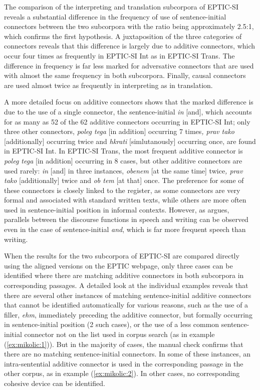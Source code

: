 \documentclass[output=paper]{langscibook}
\begin{document}
\newpage
The comparison of the interpreting and translation subcorpora of EPTIC-SI reveals a substantial difference in the frequency of use of sentence-initial connectors between the two subcorpora with the ratio being approximately 2.5:1, which confirms the first hypothesis. A juxtaposition of the three categories of connectors reveals that this difference is largely due to additive connectors, which occur four times as frequently in EPTIC-SI Int as in EPTIC-SI Trans. The difference in frequency is far less marked for adversative connectors that are used with almost the same frequency in both subcorpora. Finally, causal connectors are used almost twice as frequently in interpreting as in translation. 

A more detailed focus on additive connectors shows that the marked difference is due to the use of a single connector, the sentence-initial \textit{in} [and], which accounts for as many as 52 of the 62 additive connectors occurring in EPTIC-SI Int; only three other connectors, \textit{poleg tega} [in addition] occurring 7 times\textit{, prav tako} [additionally] occurring twice and \textit{hkrati} [simlutanously] occurring once, are found in EPTIC-SI Int. In EPTIC-SI Trans, the most frequent additive connector is \textit{poleg tega} [in addition] occurring in 8 cases, but other additive connectors are used rarely: \textit{in} [and] in three instances, \textit{obenem} [at the same time] twice\textit{, prav tako} [additionally] twice and \textit{ob tem} [at that] once. The preference for some of these connectors is closely linked to the register, as some connectors are very formal and associated with standard written texts, while others are more often used in sentence-initial position in informal contexts. However, as \citet{Dorgeloh2004} argues, parallels between the discourse functions in speech and writing can be observed even in the case of sentence-initial \textit{and}, which is far more frequent speech than writing.

When the results for the two subcorpora of EPTIC-SI are compared directly using the aligned versions on the EPTIC webpage, only three cases can be identified where there are matching additive connectors in both subcorpora in corresponding passages. A detailed look at the individual examples reveals that there are several other instances of matching sentence-initial additive connectors that cannot be identified automatically for various reasons, such as the use of a filler, \textit{ehm}, immediately preceding the additive connector, but formally occurring in sentence-initial position (2 such cases), or the use of a less common sentence-initial connector not on the list used in corpus search (as in example (\ref{ex:mikolic:1})). But in the majority of cases, the manual check confirms that there are no matching sentence-initial connectors. In some of these instances, an intra-sentential additive connector is used in the corresponding passage in the other corpus, as in example (\ref{ex:mikolic:2}). In other cases, no corresponding cohesive device can be identified.  
\end{document}
